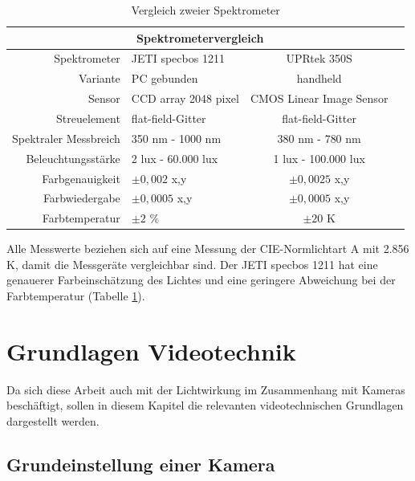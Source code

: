 \begin{table}[htp] 
		\centering
		\begin{tabular}{rlcc}  %
		\toprule
		\multicolumn{3}{c}{\large\sffamily Spektrometervergleich}\\ 							
		\midrule
		Spektrometer & JETI specbos 1211 & UPRtek 350S\\
		Variante & PC gebunden & handheld\\
		Sensor & CCD array 2048 pixel & CMOS Linear Image Sensor\\
		Streuelement & flat-field-Gitter & flat-field-Gitter\\
		Spektraler Messbreich & 350 nm - 1000 nm & 380 nm - 780 nm\\
		Beleuchtungsstärke & 2 lux - 60.000 lux & 1 lux - 100.000 lux\\
		Farbgenauigkeit &  $\pm 0,002$ x,y & $\pm 0,0025$ x,y\\
		Farbwiedergabe &  $\pm 0,0005$ x,y & $\pm 0,0005$ x,y\\		
		Farbtemperatur &  $\pm 2$ $\%$ & $\pm 20$ K\\
		\bottomrule
		\end{tabular}
		\caption{Vergleich zweier Spektrometer\protect\footnotemark}	
		\label{t_spek}
	\end{table}

\noindent Alle Messwerte beziehen sich auf eine Messung der CIE-Normlichtart A mit 2.856 K, damit die Messgeräte vergleichbar sind. Der JETI specbos 1211 hat eine genauerer Farbeinschätzung des Lichtes und eine geringere Abweichung bei der Farbtemperatur (Tabelle \ref{t_spek}).




\chapter{Grundlagen Videotechnik}
Da sich diese Arbeit auch mit der Lichtwirkung im Zusammenhang mit Kameras beschäftigt, sollen in diesem Kapitel die relevanten videotechnischen Grundlagen dargestellt werden.

\section{Grundeinstellung einer Kamera}

